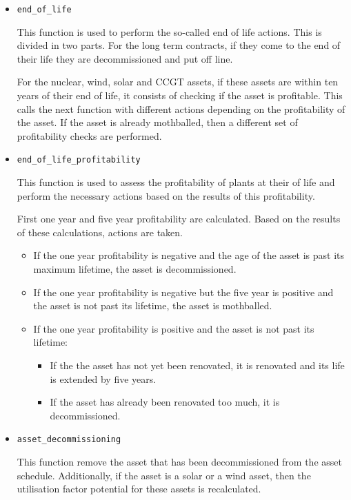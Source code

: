 \begin{itemize}
\item \texttt{end\_of\_life}

This function is used to perform the so-called end of life actions. This is divided in two parts. For the long term contracts, if they come to the end of their life they are decommissioned and put off line.

For the nuclear, wind, solar and CCGT assets, if these assets are within ten years of their end of life, it consists of checking if the asset is profitable. This calls the next function with different actions depending on the profitability of the asset. If the asset is already mothballed, then a different set of profitability checks are performed.

\item \texttt{end\_of\_life\_profitability}

This function is used to assess the profitability of plants at their of life and perform the necessary actions based on the results of this profitability.

First one year and five year profitability are calculated. Based on the results of these calculations, actions are taken.

	\begin{itemize}
	\item If the one year profitability is negative and the age of the asset is past its maximum lifetime, the asset is decommissioned.
	\item If the one year profitability is negative but the five year is positive and the asset is not past its lifetime, the asset is mothballed.
	\item If the one year profitability is positive and the asset is not past its lifetime:
		\begin{itemize}
		\item If the the asset has not yet been renovated, it is renovated and its life is extended by five years.
		\item If the asset has already been renovated too much, it is decommissioned.
		\end{itemize}
	\end{itemize}

\item \texttt{asset\_decommissioning}

This function remove the asset that has been decommissioned from the asset schedule. Additionally, if the asset is a solar or a wind asset, then the utilisation factor potential for these assets is recalculated.


\end{itemize}

